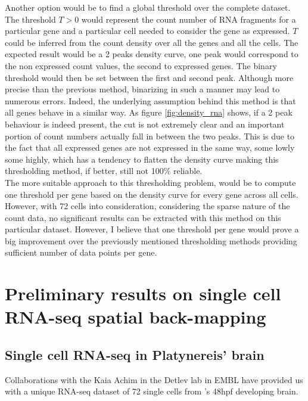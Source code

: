   Another option would be to find a global threshold over the complete dataset. The threshold $T>0$ would represent the count number of RNA fragments for a particular gene and a particular cell needed to consider the gene as expressed. $T$ could be inferred from the count density over all the genes and all the cells. The expected result would be a 2 peaks density curve, one peak would correspond to the non expressed count values, the second to expressed genes. The binary threshold would then be set between the first and second peak. Although more precise than the previous method, binarizing in such a manner may lead to numerous errors. Indeed, the underlying assumption behind this method is that all genes behave in a similar way. As figure \ref{fig:density_rna} shows, if a 2 peak behaviour is indeed present, the cut is not extremely clear and an important portion of count numbers actually fall in between the two peaks. This is due to the fact that all expressed genes are not expressed in the same way, some lowly some highly, which has a tendency to flatten the density curve making this thresholding method, if better, still not 100\% reliable.\\
  
  The more suitable approach to this thresholding problem, would be to compute one threshold per gene based on the density curve for every gene across all cells. However, with 72 cells into consideration, considering the sparse nature of the count data, no significant results can be extracted with this method on this particular dataset. However, I believe that one threshold per gene would prove a big improvement over the previously mentioned thresholding methods providing sufficient number of data points per gene.

\section{Preliminary results on single cell RNA-seq spatial back-mapping
}\label{sec:back_mapping_platy}
  \subsection{Single cell RNA-seq in Platynereis' brain}
  
    	Collaborations with the Kaia Achim in the Detlev lab in EMBL have provided us with a unique RNA-seq dataset of 72 single cells from \platy{}'s 48hpf developing brain. 
    	
